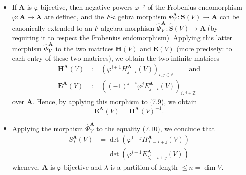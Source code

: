 \documentclass[numbers=enddot,12pt,final,onecolumn,notitlepage]{scrartcl}%
\theoremstyle{definition}
\begin{document}
\begin{enumerate}
\begin{itemize}
\item If $\mathbf{A}$ is $\varphi$-bijective, then negative powers
$\varphi^{-j}$ of the Frobenius endomorphism $\varphi:\mathbf{A}%
\rightarrow\mathbf{A}$ are defined, and the $F$-algebra morphism $\Phi
_{V}^{\mathbf{A}}:\mathbf{S}\left(  V\right)  \rightarrow\mathbf{A}$ can be
canonically extended to an $F$-algebra morphism $\widehat{\Phi}_{V}%
^{\mathbf{A}}:\widehat{\mathbf{S}}\left(  V\right)  \rightarrow\mathbf{A}$ (by
requiring it to respect the Frobenius endomorphism). Applying this latter
morphism $\widehat{\Phi}_{V}^{\mathbf{A}}$ to the two matrices $\mathbf{H}%
\left(  V\right)  $ and $\mathbf{E}\left(  V\right)  $ (more precisely: to
each entry of these two matrices), we obtain the two infinite matrices%
\begin{align*}
\mathbf{H}^{\mathbf{A}}\left(  V\right)   &  :=\left(  \varphi^{i+1}%
H_{j-i}^{\mathbf{A}}\left(  V\right)  \right)  _{i,j\in\mathbb{Z}%
}\ \ \ \ \ \ \ \ \ \ \text{and}\\
\mathbf{E}^{\mathbf{A}}\left(  V\right)   &  :=\left(  \left(  -1\right)
^{j-i}\varphi^{j}E_{j-i}^{\mathbf{A}}\left(  V\right)  \right)  _{i,j\in
\mathbb{Z}}%
\end{align*}
over $\mathbf{A}$. Hence, by applying this morphism to (7.9), we obtain%
\begin{equation}
\mathbf{E}^{\mathbf{A}}\left(  V\right)  =\mathbf{H}^{\mathbf{A}}\left(
V\right)  ^{-1}. \label{p26.7.9}%
\end{equation}


\item Applying the morphism $\widehat{\Phi}_{V}^{\mathbf{A}}$ to the equality
(7.10), we conclude that%
\begin{align}
S_{\lambda}^{\mathbf{A}}\left(  V\right)   &  =\det\left(  \varphi
^{1-j}H_{\lambda_{i}-i+j}^{\mathbf{A}}\left(  V\right)  \right)
\label{p26.7.10a}\\
&  =\det\left(  \varphi^{j-1}E_{\lambda_{i}^{\prime}-i+j}^{\mathbf{A}}\left(
V\right)  \right)  \label{p26.7.10b}%
\end{align}
whenever $\mathbf{A}$ is $\varphi$-bijective and $\lambda$ is a partition of
length $\leq n=\dim V$.


\end{itemize}
\end{enumerate}
\end{document}
